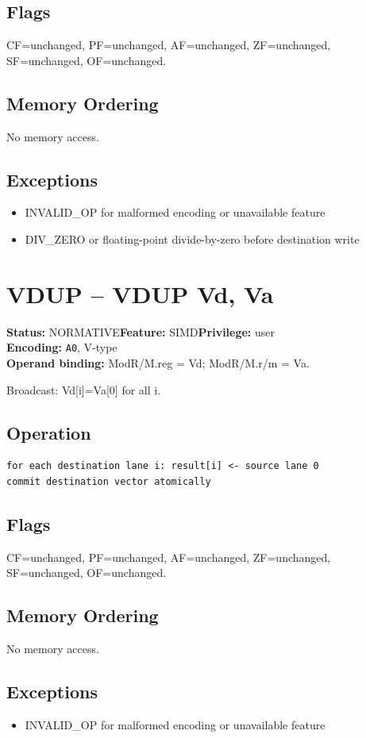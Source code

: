\documentclass[10pt]{article}
\begin{document}
\subsection*{Flags}
CF=unchanged, PF=unchanged, AF=unchanged, ZF=unchanged, SF=unchanged, OF=unchanged.
\subsection*{Memory Ordering}
No memory access.
\subsection*{Exceptions}
\begin{itemize}
\item INVALID\_OP for malformed encoding or unavailable feature
\item DIV\_ZERO or floating-point divide-by-zero before destination write
\end{itemize}
\clearpage

\section{VDUP -- VDUP Vd, Va}
\textbf{Status:} NORMATIVE\quad \textbf{Feature:} SIMD\quad \textbf{Privilege:} user\\
\textbf{Encoding:} \texttt{A0}, V-type\\
\textbf{Operand binding:} ModR/M.reg = Vd; ModR/M.r/m = Va.

Broadcast: Vd[i]=Va[0] for all i.

\subsection*{Operation}
\begin{lstlisting}
for each destination lane i: result[i] <- source lane 0
commit destination vector atomically
\end{lstlisting}
\subsection*{Flags}
CF=unchanged, PF=unchanged, AF=unchanged, ZF=unchanged, SF=unchanged, OF=unchanged.
\subsection*{Memory Ordering}
No memory access.
\subsection*{Exceptions}
\begin{itemize}
\item INVALID\_OP for malformed encoding or unavailable feature
\end{itemize}
\clearpage
\end{document}
